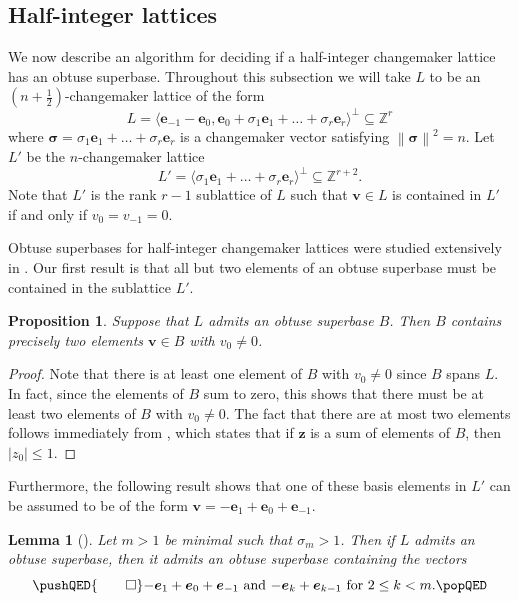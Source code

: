 \documentclass{amsart} %
\newcommand{\Z}{\mathbb{Z}}
\newcommand{\e}{\bm{e}}
\newcommand{\bv}{\bm{v}}
\newcommand{\bsigma}{\bm{\sigma}}
\newcommand{\norm}[1]{\left\lVert #1 \right\rVert^2}
\theoremstyle{thm}
\newtheorem{lem}[Theorem]{Lemma}
\newtheorem{prop}[Theorem]{Proposition}
\theoremstyle{definition}
\numberwithin{equation}{section}
\begin{document}
\subsection{Half-integer lattices}\label{sec:half_int_basis_search} We now describe an algorithm for deciding if a half-integer changemaker lattice has an obtuse superbase. Throughout this subsection we will take $L$ to be an $(n+\frac{1}{2})$-changemaker lattice of the form
\[
L=\langle \e_{-1}-\e_0 , \e_0 + \sigma_1 \e_1 + \dots + \sigma_r \e_r \rangle^\perp \subseteq \Z^r
\]
where $\bsigma=\sigma_1 \e_1 + \dots + \sigma_r \e_r$ is a changemaker vector satisfying $\norm{\bsigma}=n$. Let $L'$ be the $n$-changemaker lattice
\[
L'=\langle \sigma_1 \e_1 + \dots + \sigma_r \e_r \rangle^\bot \subseteq \Z^{r+2}. 
\]
Note that $L'$ is the rank $r-1$ sublattice of $L$ such that $\bv\in L$ is contained in $L'$ if and only if $v_0=v_{-1}=0$.

Obtuse superbases for half-integer changemaker lattices were studied extensively in \cite{McCoyAltUnknotting}. Our first result is that all but two elements of an obtuse superbase must be contained in the sublattice $L'$.
\begin{prop}
    Suppose that $L$ admits an obtuse superbase $B$. Then $B$ contains precisely two elements $\bv\in B$ with $v_0 \neq 0$.    
    \end{prop}
\begin{proof}
    Note that there is at least one element of $B$ with $v_0\neq 0$ since $B$ spans $L$. In fact, since the elements of $B$ sum to zero, this shows that there must be at least two elements of $B$ with $v_0\neq 0$.
    The fact that there are at most two elements follows immediately from \cite[Lemma~5.3(i)]{McCoyAltUnknotting}, which states that if $\bm{z}$ is a sum of elements of $B$, then $|z_0|\leq 1$.
\end{proof}
Furthermore, the following result shows that one of these basis elements in $L'$ can be assumed to be of the form $\bv=-\e_1+\e_0+\e_{-1}$.
\begin{lem}[{\cite[Lemma 5.7]{McCoyAltUnknotting}}]\label{lem:half_int_basis_form}
    Let $m>1$ be minimal such that $\sigma_m>1$. Then if $L$ admits an obtuse superbase, then it admits an obtuse superbase containing the vectors
    \[
\pushQED{\qed} 
    \text{$-\e_1+\e_0+\e_{-1}$ and $-\e_k + \e_{k-1}$ for $2\leq k <m$.}
\qedhere
\popQED
\] 
\end{lem}
\end{document}
